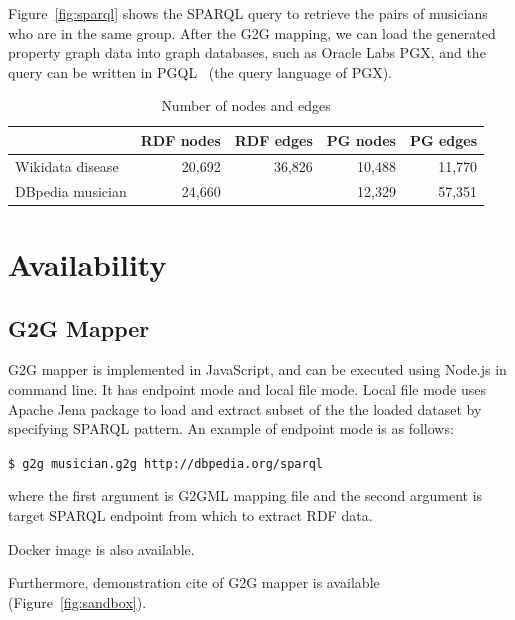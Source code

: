 \documentclass[runningheads]{llncs}
\begin{document}
Figure~\ref{fig:sparql} shows the SPARQL query to retrieve the pairs of musicians who are in the same group. After the G2G mapping, we can load the generated property graph data into graph databases, such as Oracle Labs PGX, and the query can be written in PGQL~\cite{pgql} (the query language of PGX).

\begin{table}[h]
    \centering
    \begin{tabular}{l|r|r|r|r}
        \hline
        & RDF nodes & RDF edges & PG nodes & PG edges \\
        \hline
        Wikidata disease & 20,692 & 36,826 & 10,488 & 11,770 \\
        DBpedia musician & 24,660 &  & 12,329 & 57,351 \\
        \hline
    \end{tabular}
    \caption{Number of nodes and edges}
    \label{tab:my_label}
\end{table}


\section{Availability}

\subsection{G2G Mapper}

G2G mapper is implemented in JavaScript, and can be executed using Node.js in command line. It has endpoint mode and local file mode. Local file mode uses Apache Jena package to load and extract subset of the the loaded dataset by specifying SPARQL pattern. An example of endpoint mode is as follows:

\texttt{\$ g2g musician.g2g http://dbpedia.org/sparql}

\noindent where the first argument is G2GML mapping file and the second argument is target SPARQL endpoint from which to extract RDF data.

Docker image is also available.

Furthermore, demonstration cite of G2G mapper is available (Figure~\ref{fig:sandbox}).
\end{document}

